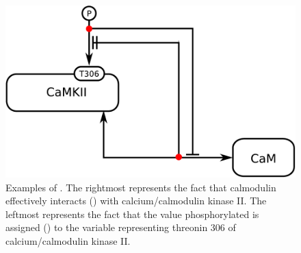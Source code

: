 \begin{figure}[H]
  \centering
  \includegraphics[scale = 0.5]{examples/ex-outcome}
  \caption{Examples of . The rightmost represents the fact that calmodulin effectively interacts () with calcium/calmodulin kinase II. The leftmost represents the fact that the value phosphorylated is assigned () to the variable representing threonin 306 of calcium/calmodulin kinase II.}
  \label{fig:ex-outcome}
\end{figure}

	
